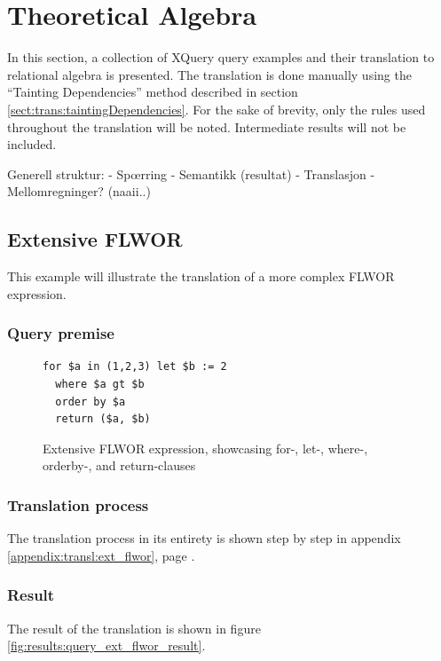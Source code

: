 \section{Theoretical Algebra}
In this section, a collection of XQuery query examples and their translation to
relational algebra is presented. The translation is done manually using the
``Tainting Dependencies'' method described in section
\ref{sect:trans:taintingDependencies}. For the sake of brevity, only the
rules used throughout the translation will be noted. Intermediate results will
not be included.

Generell struktur:
- Sp\oe rring
- Semantikk (resultat)
- Translasjon
- Mellomregninger? (naaii..)

\subsection{Extensive FLWOR}
This example will illustrate the translation of a more complex FLWOR expression.

\subsubsection{Query premise}
\begin{figure}[htp]
\begin{center}
\begin{Verbatim}
for $a in (1,2,3) let $b := 2
  where $a gt $b
  order by $a
  return ($a, $b)
\end{Verbatim}
  \caption{Extensive FLWOR expression, showcasing for-, let-, where-, orderby-,
  and return-clauses}
  \label{fig:results:query_ext_flwor}
\end{center}
\end{figure}

\subsubsection{Translation process}
The translation process in its entirety is shown step by step in appendix
\ref{appendix:transl:ext_flwor}, page \pageref{appendix:transl:ext_flwor}.

\subsubsection{Result}
The result of the translation is shown in figure
\ref{fig:results:query_ext_flwor_result}.

